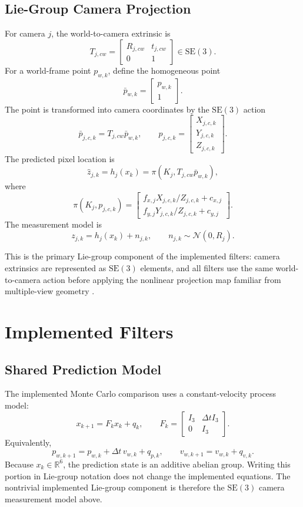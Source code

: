 \documentclass{aiaa-tc}
\newcommand{\R}{\mathbb{R}}
\newcommand{\SE}{\mathrm{SE}}
\newcommand{\N}{\mathcal{N}}
\begin{document}
\subsection{Lie-Group Camera Projection}

For camera \(j\), the world-to-camera extrinsic is
\[
T_{j,cw}
=
\begin{bmatrix}
R_{j,cw} & t_{j,cw}\\
0 & 1
\end{bmatrix}
\in \SE(3).
\]
For a world-frame point \(p_{w,k}\), define the homogeneous point
\[
\bar p_{w,k} =
\begin{bmatrix}
p_{w,k}\\
1
\end{bmatrix}.
\]
The point is transformed into camera coordinates by the \(\SE(3)\) action
\[
\bar p_{j,c,k} = T_{j,cw}\bar p_{w,k},
\qquad
p_{j,c,k} =
\begin{bmatrix}
X_{j,c,k}\\
Y_{j,c,k}\\
Z_{j,c,k}
\end{bmatrix}.
\]
The predicted pixel location is
\[
\hat z_{j,k}
=
h_j(x_k)
=
\pi(K_j,T_{j,cw}\bar p_{w,k}),
\]
where
\[
\pi(K_j,p_{j,c,k})
=
\begin{bmatrix}
f_{x,j}X_{j,c,k}/Z_{j,c,k}+c_{x,j}\\
f_{y,j}Y_{j,c,k}/Z_{j,c,k}+c_{y,j}
\end{bmatrix}.
\]
The measurement model is
\[
z_{j,k}
=
h_j(x_k)+n_{j,k},
\qquad
n_{j,k}\sim \N(0,R_j).
\]

This is the primary Lie-group component of the implemented filters: camera
extrinsics are represented as \(\SE(3)\) elements, and all filters use the same
world-to-camera action before applying the nonlinear projection map familiar
from multiple-view geometry \cite{hartley2004}.

\section{Implemented Filters}

\subsection{Shared Prediction Model}

The implemented Monte Carlo comparison uses a constant-velocity process model:
\[
x_{k+1} =
F_k x_k + q_k,
\qquad
F_k =
\begin{bmatrix}
I_3 & \Delta t I_3\\
0 & I_3
\end{bmatrix}.
\]
Equivalently,
\[
p_{w,k+1}=p_{w,k}+\Delta t\,v_{w,k}+q_{p,k},
\qquad
v_{w,k+1}=v_{w,k}+q_{v,k}.
\]
Because \(x_k\in \R^6\), the prediction state is an additive abelian group.
Writing this portion in Lie-group notation does not change the implemented
equations.  The nontrivial implemented Lie-group component is therefore the
\(\SE(3)\) camera measurement model above.
\end{document}
